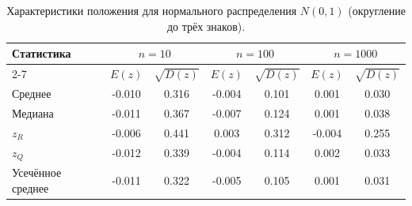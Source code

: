\begin{table}[H]
\centering
\small
\begin{tabular}{|l|cc|cc|cc|}
\hline
\multirow{2}{*}{Статистика} & \multicolumn{2}{c|}{$n=10$} & \multicolumn{2}{c|}{$n=100$} & \multicolumn{2}{c|}{$n=1000$} \\
\cline{2-7}
 & $E(z)$ & $\sqrt{D(z)}$ & $E(z)$ & $\sqrt{D(z)}$ & $E(z)$ & $\sqrt{D(z)}$ \\
\hline
Среднее & -0.010 & 0.316 & -0.004 & 0.101 & 0.001 & 0.030 \\
\hline
Медиана & -0.011 & 0.367 & -0.007 & 0.124 & 0.001 & 0.038 \\
\hline
$z_R$ & -0.006 & 0.441 & 0.003 & 0.312 & -0.004 & 0.255 \\
\hline
$z_Q$ & -0.012 & 0.339 & -0.004 & 0.114 & 0.002 & 0.033 \\
\hline
Усечённое среднее & -0.011 & 0.322 & -0.005 & 0.105 & 0.001 & 0.031 \\
\hline
\end{tabular}
\caption{Характеристики положения для нормального распределения $N(0,1)$ (округление до трёх знаков).}
\label{tab:normal_rounded}
\end{table}